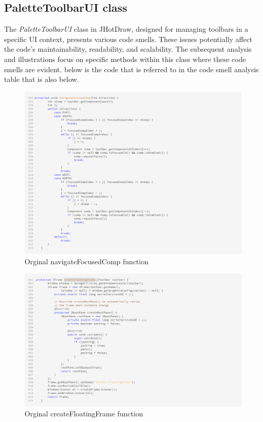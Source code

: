 \subsection{PaletteToolbarUI class}


The \textit{PaletteToolbarUI} class in JHotDraw, designed for managing toolbars in a specific UI context, presents various code smells.
These issues potentially affect the code's maintainability, readability, and scalability.
The subsequent analysis and illustrations focus on specific methods within this class where these code smells are evident.
below is the code that is referred to in the code smell analysis table that is also below.



\begin{figure}[H]
    \centering
    \includegraphics[width=\linewidth]{pic/navigateFocusedComp.png}
    \caption{Orginal navigateFocusedComp function}
    \label{fig:Orginal navigateFocusedComp function}
\end{figure}

\begin{figure}[H]
    \centering
    \includegraphics[width=\linewidth]{pic/createFloatingFrame.png}
    \caption{Orginal createFloatingFrame function}
    \label{fig:Orginal createFloatingFrame function}
\end{figure}

